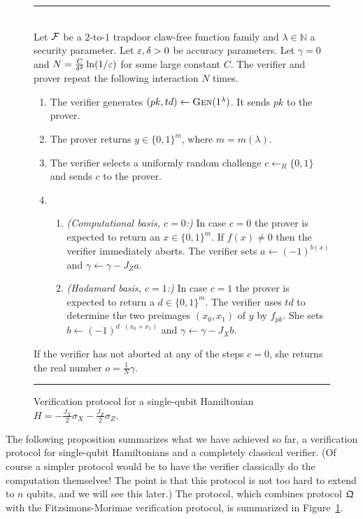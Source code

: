 \begin{figure}[htbp]
\rule[1ex]{16.5cm}{0.5pt}\\
Let $\mathcal{F}$ be a $2$-to-$1$ trapdoor claw-free function family and $\lambda\in\mathbb{N}$ a security parameter. Let $\varepsilon,\delta>0$ be accuracy parameters.  Let $\gamma = 0$ and $N = \frac{C}{\delta^2} \ln(1/\varepsilon)$ for some large constant $C$.
The verifier and prover repeat the following interaction $N$ times.
 \begin{enumerate}
\item The verifier generates $(pk,td)\leftarrow \textsc{Gen}(1^\lambda)$. It sends $pk$ to the prover. 
\item The prover returns $y \in \{0,1\}^m$, where $m=m(\lambda)$. 
\item The verifier selects a uniformly random challenge $c\leftarrow_R \{0,1\}$ and sends $c$ to the prover. 
\item 
\begin{enumerate}
\item \emph{(Computational basis, $c=0$:)} In case $c=0$ the prover is expected to return an $x\in\{0,1\}^m$. If $f(x)\neq 0$ then the verifier immediately aborts. The verifier sets $a\leftarrow (-1)^{b(x)}$ and $\gamma \leftarrow \gamma - J_Z a$. 
\item \emph{(Hadamard basis, $c=1$:)} In case $c=1$ the prover is expected to return a $d\in \{0,1\}^m$. The verifier uses $td$ to determine the two preimages $(x_0,x_1)$ of $y$ by $f_{pk}$. She sets $b\leftarrow (-1)^{d\cdot(x_0+ x_1)}$ and $\gamma \leftarrow \gamma - J_X b$. 
\end{enumerate}
\end{enumerate}
If the verifier has not aborted at any of the steps $c=0$, she returns the real number $o=\frac{1}{N}\gamma$. 
\rule[1ex]{16.5cm}{0.5pt}
\caption{Verification protocol for a single-qubit Hamiltonian $H = -\frac{J_X}{2} \sigma_X - \frac{J_Z}{2}\sigma_Z$.}
\label{fig:protocol-mahadev-oq}
\end{figure}

The following proposition summarizes what we have achieved so far, a verification protocol for single-qubit Hamiltonians and a completely classical verifier. (Of course a simpler protocol would be to have the verifier classically do the computation themselves! The point is that this protocol is not too hard to extend to $n$ qubits, and we will see this later.) The protocol, which combines protocol $\mathfrak{Q}$ with the Fitzsimons-Morimae verification protocol, is summarized in Figure~\ref{fig:protocol-mahadev-oq}. 


